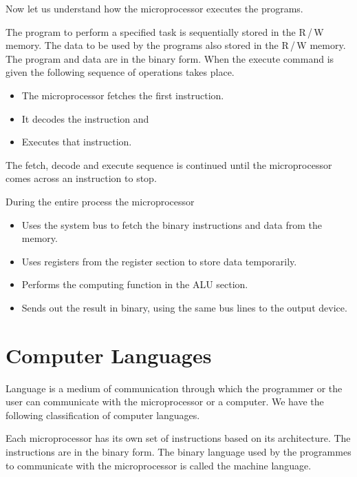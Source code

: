 Now let us understand how the microprocessor executes the programs.

The program to perform a specified task is sequentially stored in the R\,/\,W memory. The data to be used by the programs also stored in the R\,/\,W memory. The program and data are in the binary form. When the execute command is given the following sequence of operations takes place.
\begin{itemize}
\itemsep=0pt
\item The microprocessor fetches the first instruction.

\item It decodes the instruction and

\item Executes that instruction.
\end{itemize}

The fetch, decode and execute sequence is continued until the microprocessor comes across an instruction to stop.


During the entire process the microprocessor
\begin{itemize}
\itemsep=0pt
\item Uses the system bus to fetch the binary instructions and data from the memory.

\item Uses registers from the register section to store data temporarily. 

\item Performs the computing function in the ALU section.

\item Sends out the result in binary, using the same bus lines to the output device.
\end{itemize}

\section{Computer Languages}\label{sec7.6}

Language is a medium of communication through which the programmer or the user can communicate with the microprocessor or a computer. We have the following classification of computer languages.

\medskip
{}

Each microprocessor has its own set of instructions based on its architecture. The instructions are in the binary form. The binary language used by the programmes to communicate with the microprocessor is called the machine language.

